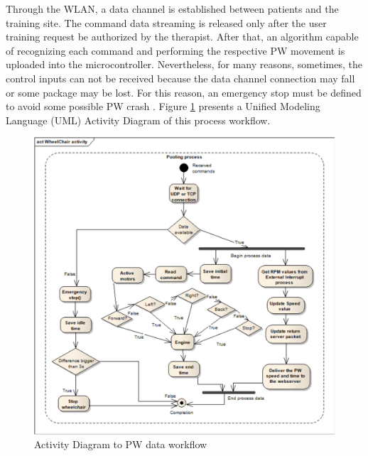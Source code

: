 Through the WLAN, a data channel is established between patients and the training site. The command data streaming is released only after the user training request be authorized by the therapist. After that, an algorithm capable of recognizing each command and performing the respective PW movement is uploaded into the microcontroller. Nevertheless, for many reasons, sometimes, the control inputs can not be received because the data channel connection may fall or some package may be lost. For this reason, an emergency stop must be defined to avoid some possible PW crash \cite{mitsumura2014}. Figure \ref{fig:wheelChairActivity} presents a Unified Modeling Language (UML) Activity Diagram of this process workflow.

\begin{figure}[!hbt]
\begin{center}
\includegraphics[width=0.9 \textwidth]{img/cap4/wheelChairActivity}
\caption{Activity Diagram to PW data workflow} 
\label{fig:wheelChairActivity}
\end{center}
\end{figure}

